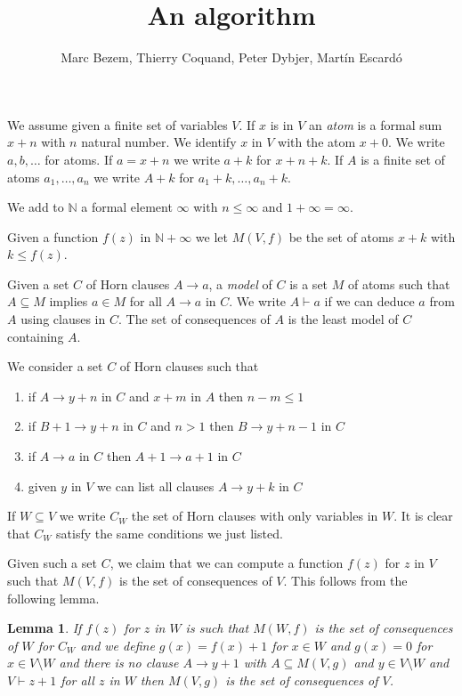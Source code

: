 \documentclass[11pt,a4paper]{article}
\newtheorem{lemma}{Lemma}[theorem]
\newcommand{\nats}{\mathbb{N}}
\begin{document}
\title{An algorithm}

\author{Marc Bezem, Thierry Coquand, Peter Dybjer, Mart\'in Escard\'o}
\date{}
\maketitle



We assume given a finite set of variables $V$. If $x$ is in $V$
an {\em atom} is a formal sum $x+n$ with $n$ natural number. We identify
$x$ in $V$ with the atom $x+0$. We write $a,b,\dots$ for atoms.
If $a = x+n$ we write $a+k$ for $x+n+k$. If $A$ is a finite set of atoms $a_1,\dots,a_n$
we write $A+k$ for $a_1+k,\dots, a_n+k$.

 We add to $\nats$ a formal element $\infty$ with $n\leqslant \infty$ and $1+\infty = \infty$.

 Given a function $f(z)$ in $\nats + \infty$ we let $M(V,f)$ be the set of atoms
 $x+k$ with $k\leqslant f(z)$.

 Given a set $C$ of Horn clauses $A\rightarrow a$, a {\em model} of $C$ is
a set $M$ of atoms such that $A\subseteq M$ implies $a\in M$ for all $A\rightarrow a$
in $C$. We write $A\vdash a$ if we can deduce $a$ from $A$ using clauses in $C$.
The set of consequences of $A$ is the least model of $C$ containing $A$.

 We consider a set $C$ of Horn clauses such that
\begin{enumerate}
\item if $A\rightarrow y+n$ in $C$ and $x+m$ in $A$ then $n-m\leqslant 1$
\item if $B+1\rightarrow y+n$ in $C$ and $n>1$ then $B\rightarrow y+n-1$ in $C$
\item if $A\rightarrow a$ in $C$ then $A+1\rightarrow a+1$ in $C$
\item given $y$ in $V$ we can list all clauses $A\rightarrow y+k$ in $C$  
\end{enumerate}  

If $W\subseteq V$ we write $C_W$ the set of Horn clauses with only variables in $W$.
It is clear that $C_W$ satisfy the same conditions we just listed.

Given such a set $C$, we claim that we can compute a function $f(z)$ for $z$ in $V$
such that $M(V,f)$ is the set of consequences of $V$. This follows from the following lemma.


\begin{lemma}
  If $f(z)$ for $z$ in $W$ is such that $M(W,f)$ is the set of consequences of $W$ for $C_W$
  and we define $g(x) = f(x)+1$ for $x\in W$ and $g(x) = 0$ for $x\in V\setminus W$
  and there is no clause $A\rightarrow y+1$ with $A\subseteq M(V,g)$ and $y\in V\setminus W$
  and $V\vdash z+1$ for all $z$ in $W$
  then $M(V,g)$ is the set of consequences of $V$. 
\end{lemma}  
 
\end{document}
